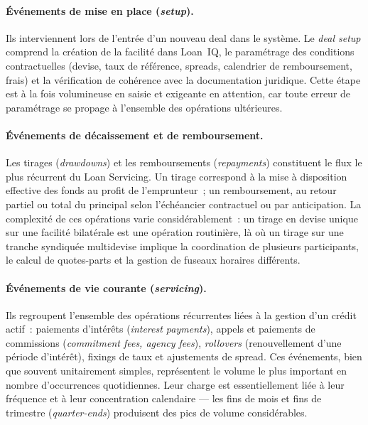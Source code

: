 \paragraph{Événements de mise en place (\textit{setup}).}
Ils interviennent lors de l'entrée d'un nouveau deal dans le système. Le \textit{deal setup} comprend la création de la facilité dans Loan~IQ, le paramétrage des conditions contractuelles (devise, taux de référence, spreads, calendrier de remboursement, frais) et la vérification de cohérence avec la documentation juridique. Cette étape est à la fois volumineuse en saisie et exigeante en attention, car toute erreur de paramétrage se propage à l'ensemble des opérations ultérieures.

\paragraph{Événements de décaissement et de remboursement.}
Les tirages (\textit{drawdowns}) et les remboursements (\textit{repayments}) constituent le flux le plus récurrent du Loan Servicing. Un tirage correspond à la mise à disposition effective des fonds au profit de l'emprunteur~; un remboursement, au retour partiel ou total du principal selon l'échéancier contractuel ou par anticipation. La complexité de ces opérations varie considérablement~: un tirage en devise unique sur une facilité bilatérale est une opération routinière, là où un tirage sur une tranche syndiquée multidevise implique la coordination de plusieurs participants, le calcul de quotes-parts et la gestion de fuseaux horaires différents.

\paragraph{Événements de vie courante (\textit{servicing}).}
Ils regroupent l'ensemble des opérations récurrentes liées à la gestion d'un crédit actif~: paiements d'intérêts (\textit{interest payments}), appels et paiements de commissions (\textit{commitment fees, agency fees}), \textit{rollovers} (renouvellement d'une période d'intérêt), fixings de taux et ajustements de spread. Ces événements, bien que souvent unitairement simples, représentent le volume le plus important en nombre d'occurrences quotidiennes. Leur charge est essentiellement liée à leur fréquence et à leur concentration calendaire --- les fins de mois et fins de trimestre (\textit{quarter-ends}) produisent des pics de volume considérables.

